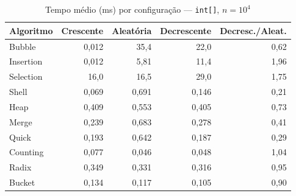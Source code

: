 \begin{table}[htbp]\centering\small
\caption{Tempo médio (ms) por configuração — \texttt{int[]}, $n = 10^4$}\label{tab:cfg-int-10k}
\begin{tabular}{lrrrr}
\toprule
Algoritmo & Crescente & Aleatória & Decrescente & Decresc./Aleat. \\
\midrule
Bubble & 0,012 & 35,4 & 22,0 & 0,62 \\
Insertion & 0,012 & 5,81 & 11,4 & 1,96 \\
Selection & 16,0 & 16,5 & 29,0 & 1,75 \\
Shell & 0,069 & 0,691 & 0,146 & 0,21 \\
Heap & 0,409 & 0,553 & 0,405 & 0,73 \\
Merge & 0,239 & 0,683 & 0,278 & 0,41 \\
Quick & 0,193 & 0,642 & 0,187 & 0,29 \\
Counting & 0,077 & 0,046 & 0,048 & 1,04 \\
Radix & 0,349 & 0,331 & 0,316 & 0,95 \\
Bucket & 0,134 & 0,117 & 0,105 & 0,90 \\
\bottomrule
\end{tabular}
\end{table}